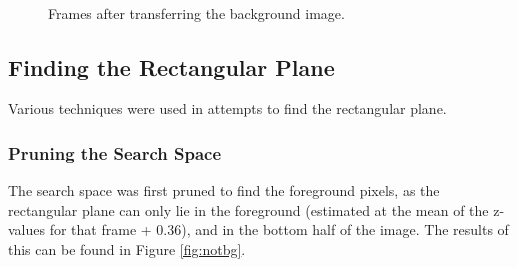 \documentclass[11pt]{article}
\begin{document}
\begin{figure}[h]
  \centering
   ~
  \hspace{0pt}
   ~
  \caption{Frames after transferring the background image.}
  \label{fig:proj}
\end{figure}

\subsection{Finding the Rectangular Plane}

Various techniques were used in attempts to find the rectangular plane. 

\subsubsection{Pruning the Search Space}
The search space was first pruned to find the foreground pixels, as the rectangular plane can only lie in the foreground (estimated at the mean of the z-values for that frame + 0.36), and in the bottom half of the image. The results of this can be found in Figure \ref{fig:notbg}.
\end{document}
